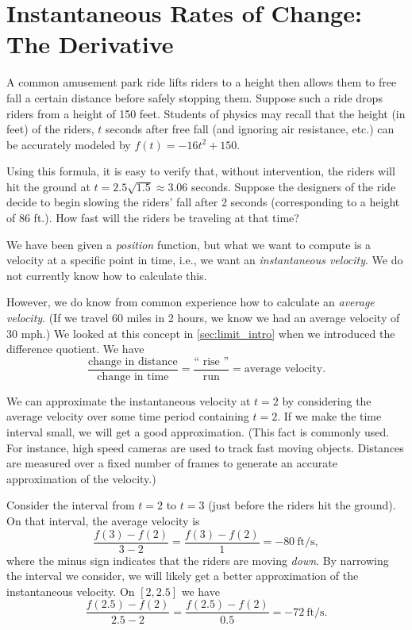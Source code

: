 \section{Instantaneous Rates of Change: The Derivative}\label{sec:derivative}

A common amusement park ride lifts riders to a height then allows them to free fall a certain distance before safely stopping them. Suppose such a ride drops riders from a height of 150 feet. Students of physics may recall that the height (in feet) of the riders, $t$ seconds after free fall (and ignoring air resistance, etc.) can be accurately modeled by $f(t) = -16t^2+150$. 

Using this formula, it is easy to verify that, without intervention, the riders will hit the ground at $t=2.5\sqrt{1.5} \approx 3.06$ seconds. Suppose the designers of the ride decide to begin slowing the riders' fall after 2 seconds (corresponding to a height of 86 ft.). How fast will the riders be traveling at that time?\bigskip

We have been given a \emph{position} function, but what we want to compute is a velocity at a specific point in time, i.e., we want an \emph{instantaneous velocity}. We do not currently know how to calculate this.

However, we do know from common experience how to calculate an \emph{average velocity}. (If we travel 60 miles in 2 hours, we know we had an average velocity of 30 mph.) We looked at this concept in \autoref{sec:limit_intro} when we introduced the difference quotient. We have 
	\[\frac{\text{change in distance}}{\text{change in time}} = \frac{\text{``\ rise\ ''}}{\text{run}} = \text{average velocity}.\]
	
We can approximate the instantaneous velocity at $t=2$ by considering the average velocity over some time period containing $t=2$. If we make the time interval small, we will get a good approximation. (This fact is commonly used. For instance, high speed cameras are used to track fast moving objects. Distances are measured over a fixed number of frames to generate an accurate approximation of the velocity.)

Consider the interval from $t=2$ to $t=3$ (just before the riders hit the ground). On that interval, the average velocity is 
		\[\frac{f(3)-f(2)}{3-2} = \frac{f(3)-f(2)}{1} =-80\ \text{ft/s},\]
where the minus sign indicates that the riders are moving \emph{down}. By narrowing the interval we consider, we will likely get a better approximation of the instantaneous velocity. On $[2,2.5]$ we have 
	\[\frac{f(2.5)-f(2)}{2.5-2} = \frac{f(2.5)-f(2)}{0.5} =-72\ \text{ft/s}.\]

